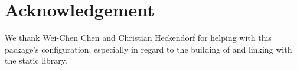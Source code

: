 \section*{Acknowledgement}

We thank Wei-Chen Chen and Christian Heckendorf for helping with this
package's configuration, especially in regard to the building of and
linking with the static library.
